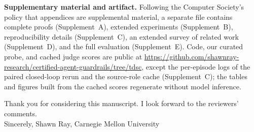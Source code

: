 \documentclass[11pt]{article}
\begin{document}
\textbf{Supplementary material and artifact.} Following the Computer Society's
policy that appendices are supplemental material, a separate file contains complete
proofs (Supplement~A), extended experiments (Supplement~B), reproducibility
details (Supplement~C), an extended survey of related work (Supplement~D), and the full evaluation
(Supplement~E). Code, our curated probe, and cached judge scores are public at
\url{https://github.com/shawnray-research/certified-agent-guardrails/tree/tdsc}, except the
per-episode logs of the paired closed-loop rerun and the source-role cache (Supplement~C);
the tables and figures built from the cached scores regenerate without model inference.

Thank you for considering this manuscript. I look forward to the reviewers'
comments.\\[0.3em]
Sincerely, Shawn Ray, Carnegie Mellon University
\end{document}
